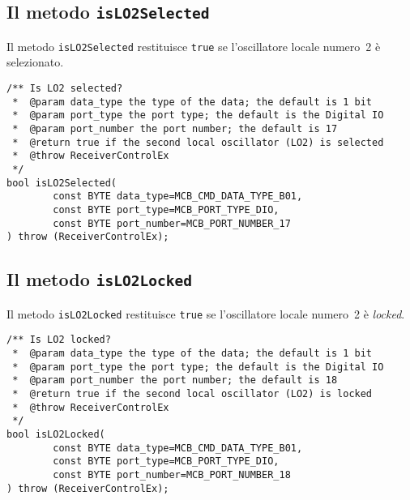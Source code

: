 \subsection{Il metodo \texttt{isLO2Selected}}
Il metodo \texttt{isLO2Selected} restituisce \texttt{true} se l'oscillatore 
locale numero~2 \`e selezionato.
\lstset{language=C++}
\begin{lstlisting}[caption={Dichiarazione del metodo \texttt{isLO2Selected}},
label=lst:isLO2Selected,mathescape]
/** Is LO2 selected?
 *  @param data_type the type of the data; the default is 1 bit
 *  @param port_type the port type; the default is the Digital IO
 *  @param port_number the port number; the default is 17
 *  @return true if the second local oscillator (LO2) is selected
 *  @throw ReceiverControlEx
 */
bool isLO2Selected(
        const BYTE data_type=MCB_CMD_DATA_TYPE_B01,
        const BYTE port_type=MCB_PORT_TYPE_DIO, 
        const BYTE port_number=MCB_PORT_NUMBER_17
) throw (ReceiverControlEx);
\end{lstlisting}
\lstset{numbers=none}


\subsection{Il metodo \texttt{isLO2Locked}}
Il metodo \texttt{isLO2Locked} restituisce \texttt{true} se l'oscillatore 
locale numero~2 \`e \emph{locked}.
\lstset{language=C++}
\begin{lstlisting}[caption={Dichiarazione del metodo \texttt{isLO2Locked}},
label=lst:isLO2Locked,mathescape]
/** Is LO2 locked?
 *  @param data_type the type of the data; the default is 1 bit
 *  @param port_type the port type; the default is the Digital IO
 *  @param port_number the port number; the default is 18
 *  @return true if the second local oscillator (LO2) is locked
 *  @throw ReceiverControlEx
 */
bool isLO2Locked(
        const BYTE data_type=MCB_CMD_DATA_TYPE_B01,
        const BYTE port_type=MCB_PORT_TYPE_DIO, 
        const BYTE port_number=MCB_PORT_NUMBER_18
) throw (ReceiverControlEx);
\end{lstlisting}
\lstset{numbers=none}


